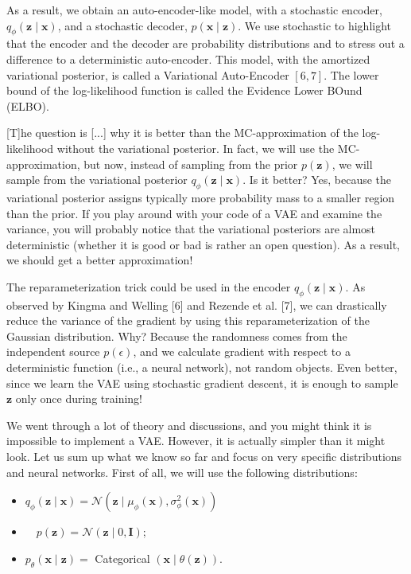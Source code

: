 \documentclass{article}
\begin{document}
\begin{appendix}
{As a result, we obtain an auto-encoder-like model, with a stochastic encoder, $q_{\phi}(\mathbf{z} \mid \mathbf{x})$, and a stochastic decoder, $p(\mathbf{x} \mid \mathbf{z})$. We use stochastic to highlight that the encoder and the decoder are probability distributions and to stress out a difference to a deterministic auto-encoder. This model, with the amortized variational posterior, is called a Variational Auto-Encoder $[6,7]$. The lower bound of the log-likelihood function is called the Evidence Lower BOund (ELBO).

[T]he question is [...] why it is better than the MC-approximation of the log-likelihood without the variational posterior. In fact, we will use the MC-approximation, but now, instead of sampling from the prior $p(\mathbf{z})$, we will sample from the variational posterior $q_{\phi}(\mathbf{z} \mid \mathbf{x})$. Is it better? Yes, because the variational posterior assigns typically more probability mass to a smaller region than the prior. If you play around with your code of a VAE and examine the variance, you will probably notice that the variational posteriors are almost deterministic (whether it is good or bad is rather an open question). As a result, we should get a better approximation!

The reparameterization trick could be used in the encoder $q_{\phi}(\mathbf{z} \mid \mathbf{x})$. As observed by Kingma and Welling [6] and Rezende et al. [7], we can drastically reduce the variance of the gradient by using this reparameterization of the Gaussian distribution. Why? Because the randomness comes from the independent source $p(\epsilon)$, and we calculate gradient with respect to a deterministic function (i.e., a neural network), not random objects. Even better, since we learn the VAE using stochastic gradient descent, it is enough to sample $\mathbf{z}$ only once during training!

We went through a lot of theory and discussions, and you might think it is impossible to implement a VAE. However, it is actually simpler than it might look. Let us sum up what we know so far and focus on very specific distributions and neural networks.
First of all, we will use the following distributions:
\begin{itemize}
    \item $q_{\phi}(\mathbf{z} \mid \mathbf{x})=\mathcal{N}\left(\mathbf{z} \mid \mu_{\phi}(\mathbf{x}), \sigma_{\phi}^{2}(\mathbf{x})\right)$
    \item $\quad p(\mathbf{z})=\mathcal{N}(\mathbf{z} \mid 0, \mathbf{I})$;
    \item $p_{\theta}(\mathbf{x} \mid \mathbf{z})=$ Categorical $(\mathbf{x} \mid \theta(\mathbf{z}))$.
\end{itemize}

}
\end{appendix}
\end{document}
